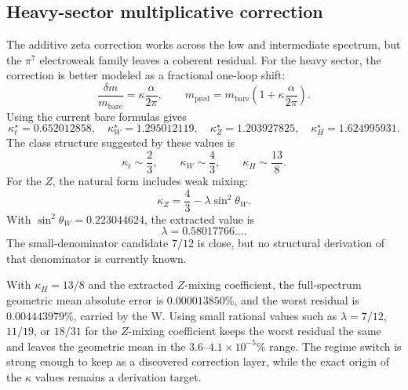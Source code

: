 \subsection{Heavy-sector multiplicative correction}

The additive zeta correction works across the low and intermediate spectrum, but the \(\pi^7\) electroweak family leaves a coherent residual.  For the heavy sector, the correction is better modeled as a fractional one-loop shift:
\[
\frac{\delta m}{m_{\mathrm{bare}}}
=
\kappa\frac{\alpha}{2\pi},
\qquad
m_{\mathrm{pred}}
=
m_{\mathrm{bare}}\left(1+\kappa\frac{\alpha}{2\pi}\right).
\]
Using the current bare formulas gives
\[
\kappa^\star_t=0.652012858,
\quad
\kappa^\star_W=1.295012119,
\quad
\kappa^\star_Z=1.203927825,
\quad
\kappa^\star_H=1.624995931.
\]
The class structure suggested by these values is
\[
\kappa_t\sim\frac23,
\qquad
\kappa_W\sim\frac43,
\qquad
\kappa_H\sim\frac{13}{8}.
\]
For the \(Z\), the natural form includes weak mixing:
\[
\kappa_Z=\frac43-\lambda\sin^2\theta_W.
\]
With \(\sin^2\theta_W=0.223044624\), the extracted value is
\[
\lambda=0.58017766\ldots.
\]
The small-denominator candidate \(7/12\) is close, but no structural derivation of that denominator is currently known.

With \(\kappa_H=13/8\) and the extracted \(Z\)-mixing coefficient, the full-spectrum geometric mean absolute error is \(0.000013850\%\), and the worst residual is \(0.004443979\%\), carried by the W.  Using small rational values such as \(\lambda=7/12\), \(11/19\), or \(18/31\) for the \(Z\)-mixing coefficient keeps the worst residual the same and leaves the geometric mean in the \(3.6\)--\(4.1\times10^{-5}\%\) range.  The regime switch is strong enough to keep as a discovered correction layer, while the exact origin of the \(\kappa\) values remains a derivation target.
